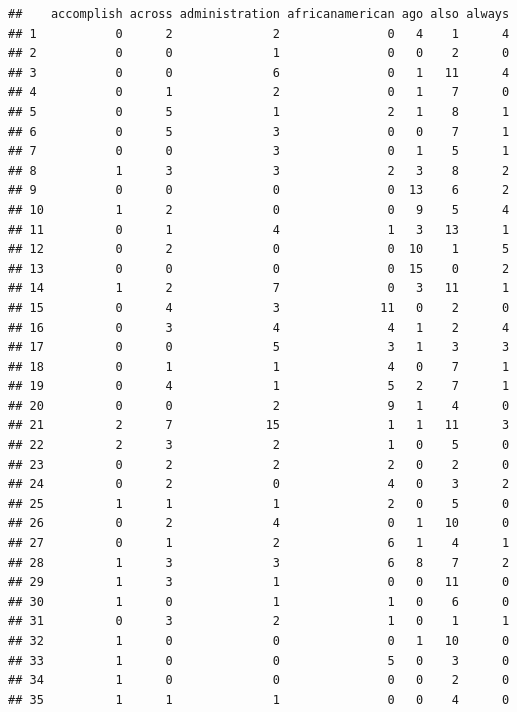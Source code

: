 \documentclass[]{article}
\begin{document}
\begin{verbatim}
##    accomplish across administration africanamerican ago also always
## 1           0      2              2               0   4    1      4
## 2           0      0              1               0   0    2      0
## 3           0      0              6               0   1   11      4
## 4           0      1              2               0   1    7      0
## 5           0      5              1               2   1    8      1
## 6           0      5              3               0   0    7      1
## 7           0      0              3               0   1    5      1
## 8           1      3              3               2   3    8      2
## 9           0      0              0               0  13    6      2
## 10          1      2              0               0   9    5      4
## 11          0      1              4               1   3   13      1
## 12          0      2              0               0  10    1      5
## 13          0      0              0               0  15    0      2
## 14          1      2              7               0   3   11      1
## 15          0      4              3              11   0    2      0
## 16          0      3              4               4   1    2      4
## 17          0      0              5               3   1    3      3
## 18          0      1              1               4   0    7      1
## 19          0      4              1               5   2    7      1
## 20          0      0              2               9   1    4      0
## 21          2      7             15               1   1   11      3
## 22          2      3              2               1   0    5      0
## 23          0      2              2               2   0    2      0
## 24          0      2              0               4   0    3      2
## 25          1      1              1               2   0    5      0
## 26          0      2              4               0   1   10      0
## 27          0      1              2               6   1    4      1
## 28          1      3              3               6   8    7      2
## 29          1      3              1               0   0   11      0
## 30          1      0              1               1   0    6      0
## 31          0      3              2               1   0    1      1
## 32          1      0              0               0   1   10      0
## 33          1      0              0               5   0    3      0
## 34          1      0              0               0   0    2      0
## 35          1      1              1               0   0    4      0

\end{verbatim}
\end{document}
